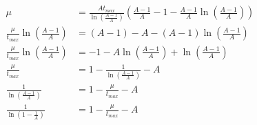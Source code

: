 \documentclass[12pt]{article}
\begin{document}
\begin{align*}
	\mu &= \frac{A t_{max}}{\ln\left(\frac{A-1}{A}\right)} \left( \frac{A-1}{A} - 1 - \frac{A-1}{A} \ln\left(\frac{A-1}{A}\right) \right) \\
	\frac{\mu}{t_{max}} \ln\left(\frac{A-1}{A}\right) &= (A - 1) - A - (A-1) \ln\left(\frac{A-1}{A}\right) \\
	\frac{\mu}{t_{max}} \ln\left(\frac{A-1}{A}\right) &= -1 - A\ln\left(\frac{A-1}{A}\right) +\ln\left(\frac{A-1}{A}\right) \\
	\frac{\mu}{t_{max}} &= 1 - \frac{1}{\ln\left(\frac{A-1}{A}\right)} - A \\
	\frac{1}{\ln\left(\frac{A-1}{A}\right)} &= 1 - \frac{\mu}{t_{max}} - A \\
	\frac{1}{\ln\left(1 - \frac{1}{A}\right)} &= 1 - \frac{\mu}{t_{max}} - A \\
\end{align*}
\end{document}
